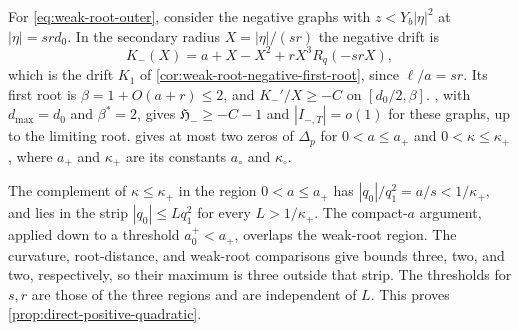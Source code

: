 For \eqref{eq:weak-root-outer}, consider the negative graphs with
\(z<Y_b|\eta|^2\) at \(|\eta|=srd_0\). In the secondary radius
\(X=|\eta|/(sr)\) the negative drift is
\[
 K_-(X)=a+X-X^2+rX^3R_q(-srX),
\]
which is the drift \(K_1\) of \cref{cor:weak-root-negative-first-root},
since \(\ell/a=sr\). Its first root is \(\beta=1+O(a+r)\le2\), and
\(K_-'/X\ge-C\) on \([d_0/2,\beta]\).
, with \(d_{\max}=d_0\) and
\(\beta^*=2\), gives \(\mathfrak H_-\ge-C-1\) and \(|I_{-,T}|=o(1)\) for
these graphs, up to the limiting root.  gives
at most two zeros of \(\Delta_p\) for \(0<a\le a_+\) and
\(0<\kappa\le\kappa_+\), where \(a_+\) and \(\kappa_+\) are its constants
\(a_\circ\) and \(\kappa_\circ\).

The complement of \(\kappa\le\kappa_+\) in the region \(0<a\le a_+\) has
\(|q_0|/q_1^2=a/s<1/\kappa_+\), and lies in the strip
\(|q_0|\le Lq_1^2\) for every \(L>1/\kappa_+\). The compact-\(a\)
argument, applied down to a threshold \(a_0^+<a_+\), overlaps the
weak-root region. The curvature, root-distance, and weak-root
comparisons give bounds three, two, and two, respectively, so their
maximum is three outside that strip. The thresholds for \(s,r\) are those
of the three regions and are independent of \(L\).
This proves \cref{prop:direct-positive-quadratic}.
